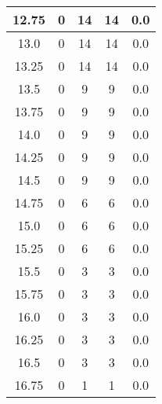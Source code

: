 \documentclass[letterpaper, 12pt]{article}
\begin{document}
\begin{longtable}{|c|c|c|c|c|}
\hline
12.75 & 0 & 14 & 14 & 0.0 \\
\hline
13.0 & 0 & 14 & 14 & 0.0 \\
\hline
13.25 & 0 & 14 & 14 & 0.0 \\
\hline
13.5 & 0 & 9 & 9 & 0.0 \\
\hline
13.75 & 0 & 9 & 9 & 0.0 \\
\hline
14.0 & 0 & 9 & 9 & 0.0 \\
\hline
14.25 & 0 & 9 & 9 & 0.0 \\
\hline
14.5 & 0 & 9 & 9 & 0.0 \\
\hline
14.75 & 0 & 6 & 6 & 0.0 \\
\hline
15.0 & 0 & 6 & 6 & 0.0 \\
\hline
15.25 & 0 & 6 & 6 & 0.0 \\
\hline
15.5 & 0 & 3 & 3 & 0.0 \\
\hline
15.75 & 0 & 3 & 3 & 0.0 \\
\hline
16.0 & 0 & 3 & 3 & 0.0 \\
\hline
16.25 & 0 & 3 & 3 & 0.0 \\
\hline
16.5 & 0 & 3 & 3 & 0.0 \\
\hline
16.75 & 0 & 1 & 1 & 0.0 \\
\hline
\end{longtable}
\end{document}
